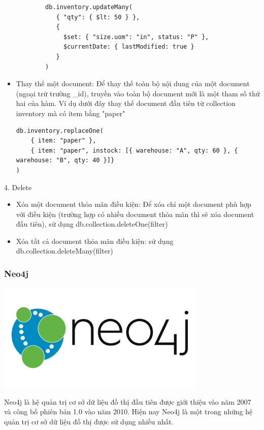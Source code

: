 \begin{description}
\begin{itemize}
\begin{verbatim}
        db.inventory.updateMany(
           { "qty": { $lt: 50 } },
           {
             $set: { "size.uom": "in", status: "P" },
             $currentDate: { lastModified: true }
           }
        )
    \end{verbatim}
    \item Thay thế một document: Để thay thế toàn bộ nội dung của một document (ngoại trừ trường \_id), truyền vào toàn bộ document mới là một tham số thứ hai của hàm. Ví dụ dưới đây thay thế document đầu tiên từ collection inventory mà có item bằng "paper"
\begin{verbatim}
db.inventory.replaceOne(
    { item: "paper" },
    { item: "paper", instock: [{ warehouse: "A", qty: 60 }, { warehouse: "B", qty: 40 }]}
)
\end{verbatim}
\end{itemize}
\item 4. Delete\\
\begin{itemize}
    \item Xóa một document thỏa mãn điều kiện: Để xóa chỉ một document phù hợp với điều kiện (trường hợp có nhiều document thỏa mãn thì sẽ xóa document đầu tiên), sử dụng db.collection.deleteOne(filter)
    \item Xóa tất cả document thỏa mãn điều kiện: sử dụng db.collection.deleteMany(filter)

\end{itemize}
\end{description}

\subsubsection{Neo4j}
\begin{center}
  \captionsetup{type=figure}
  \includegraphics[width=10cm]{img/neo4j.png}
\end{center}

Neo4j là hệ quản trị cơ sở dữ liệu đồ thị đầu tiên được giới thiệu vào năm 2007 và công bố phiên bản 1.0 vào năm 2010. Hiện nay Neo4j là một trong những hệ quản trị cơ sở dữ liệu đồ thị được sử dụng nhiều nhất.

